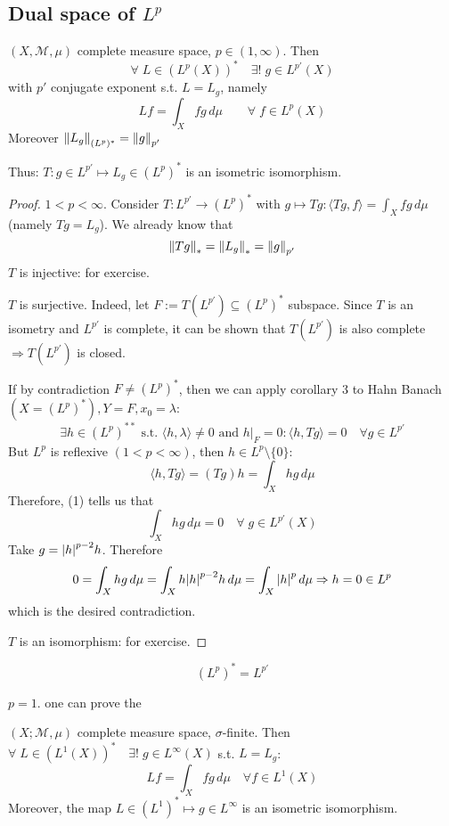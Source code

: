 \subsection*{Dual space of \(L^p\)}

\begin{theorem}
    \((X, \mathcal{M}, \mu)\) complete measure space, \(p \in (1, \infty)\). Then 
    \[
        \forall\; L \in (L^p(X))^* \quad \exists! \; g \in L^{p'}(X)
    \]
    with \(p' \) conjugate exponent s.t. \(L=L_g\), namely
    \[
        Lf = \int_X fg \, d\mu \qquad \forall\; f \in L^p(X)
    \]
    Moreover \(\norm{L_g}_{(L^p)^*} = \norm{g}_{p'}\)
    
    Thus: \(T: g \in L^{p'} \mapsto L_g \in (L^p)^*\) is an isometric isomorphism.
\end{theorem}
\begin{proof}
    \(1 < p < \infty\). Consider \(T: L^{p'} \to (L^p)^*\) with \(g \mapsto Tg: \langle Tg, f \rangle = \int_X fg \, d\mu\) (namely \(Tg = L_g\)). We already know that
    \[
        \norm{Tg}_* = \norm{L_g}_* = \norm{g}_{p'}
    \]
    \(T\) is injective: for exercise.

    \(T\) is surjective. Indeed, let \(F:= T(L^{p'}) \subseteq (L^p)^*\) subspace. Since \(T\) is an isometry and \(L^{p'}\) is complete, it can be shown that \(T(L^{p'})\) is also complete \(\Rightarrow T(L^{p'})\) is closed.

    If by contradiction \(F \neq (L^p)^*\), then we can apply corollary 3 to Hahn Banach \((X = (L^p)^*), Y=F, x_0 = \lambda\):
    \[
        \exists h \in (L^p)^{**} \text{ s.t. } \langle h, \lambda \rangle \neq 0 \text{ and } h|_F = 0: \langle h, Tg \rangle =0 \quad \forall g \in L^{p'} \tag*{1} 
    \]
    But \(L^p \) is reflexive \((1 <p < \infty)\), then \(h \in L^p \setminus \{0\}\):
    \[
        \langle h, Tg \rangle = (Tg)h = \int_X hg \, d\mu
    \]
    Therefore, (1) tells us that
    \[
        \int_X hg \, d\mu =0 \quad \forall \; g \in L^{p'}(X)
    \]
    Take \(g = \abs{h}^{p-2}h\). Therefore
    \[
        0 = \int_X hg \, d\mu = \int_X h \abs{h}^{p-2} h \, d\mu = \int_X \abs{h}^p \, d\mu \Rightarrow h=0 \in L^p
    \]
    which is the desired contradiction.

    \(T\) is an isomorphism: for exercise.
\end{proof}

\[
    (L^p)^* = L^{p'}
\]

\begin{remark}
    \(p=1\). one can prove the
\end{remark}
\begin{theorem}
    \((X; \mathcal{M}, \mu)\) complete measure space, \(\sigma\)-finite.
    Then \(\forall\; L \in (L^1(X))^* \quad \exists! \; g \in L^\infty(X)\) s.t. \(L=L_g\):
    \[
        Lf = \int_X fg \, d\mu \quad \forall f \in L^1(X)
    \]
    Moreover, the map \(L \in (L^1)^* \mapsto g \in L^\infty\) is an isometric isomorphism.
\end{theorem}

